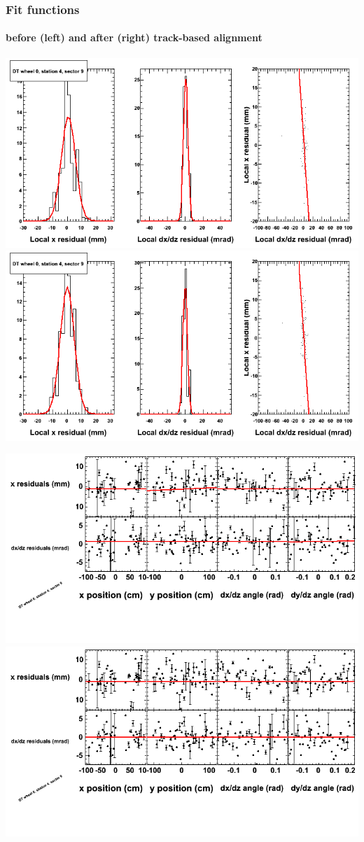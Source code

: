 \documentclass[compress]{beamer}
\begin{document}
\begin{frame}
\frametitle{Fit functions}
\framesubtitle{before (left) and after (right) track-based alignment}
\includegraphics[width=0.5\linewidth]{fitfunctions_re01/MBwhCst4sec09_bellcurves.png} \includegraphics[width=0.5\linewidth]{fitfunctions_re05/MBwhCst4sec09_bellcurves.png}

\includegraphics[width=0.5\linewidth]{fitfunctions_re01/MBwhCst4sec09_polynomials.png} \includegraphics[width=0.5\linewidth]{fitfunctions_re05/MBwhCst4sec09_polynomials.png}
\end{frame}
\end{document}
